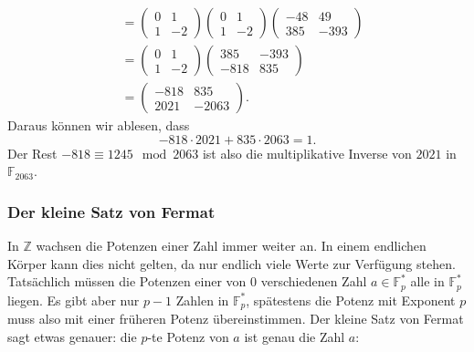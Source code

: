 \begin{beispiel}
\begin{align*}
\\
&=
\begin{pmatrix} 0& 1\\ 1& -2 \end{pmatrix}
\begin{pmatrix} 0& 1\\ 1& -2 \end{pmatrix}
\begin{pmatrix} -48& 49\\ 385& -393 \end{pmatrix}
\\
&=
\begin{pmatrix} 0& 1\\ 1& -2 \end{pmatrix}
\begin{pmatrix} 385& -393\\ -818& 835 \end{pmatrix}
\\
&=
\begin{pmatrix} -818&   835\\ 2021& -2063\end{pmatrix}.
\end{align*}
Daraus können wir ablesen, dass
\[
-818\cdot 2021 +835 \cdot 2063=1.
\]
Der Rest $ -818\equiv 1245\mod 2063$ ist also die multiplikative
Inverse von $2021$ in $\mathbb{F}_{2063}$.
\end{beispiel}

\subsubsection{Der kleine Satz von Fermat}
%
%
In $\mathbb{Z}$ wachsen die Potenzen einer Zahl immer weiter an.
In einem endlichen Körper kann dies nicht gelten, da nur endlich
viele Werte zur Verfügung stehen.
Tatsächlich müssen die Potenzen einer von $0$ verschiedenen Zahl
$a\in\mathbb{F}_p^*$ alle in $\mathbb{F}_p^*$ liegen.
Es gibt aber nur $p-1$ Zahlen in $\mathbb{F}_p^*$, spätestens
die Potenz mit Exponent $p$ muss also mit einer früheren Potenz
übereinstimmen.
Der kleine Satz von Fermat sagt etwas genauer: die $p$-te Potenz
von $a$ ist genau die Zahl $a$:

